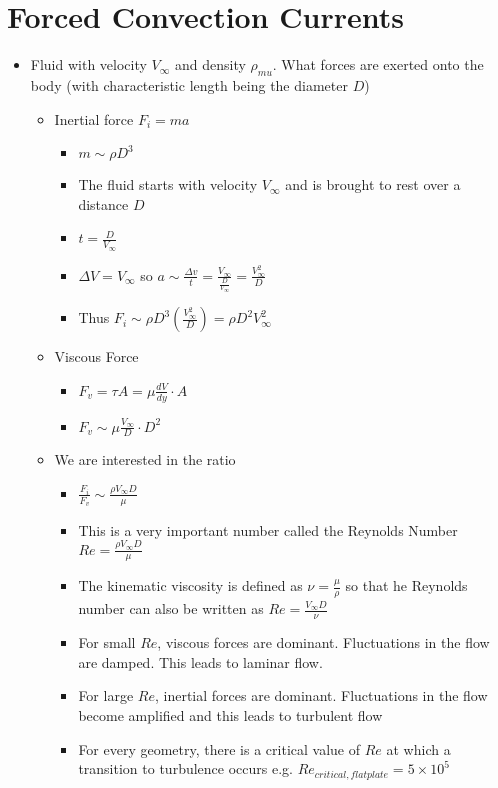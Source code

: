 \documentclass[12pt]{article}
\begin{document}
\section{Forced Convection Currents} \begin{itemize}
    \item Fluid with velocity $V_{\infty}$ and density $\rho_{mu}$. What forces are exerted onto the body (with characteristic length being the diameter $D$) \begin{itemize}
        \item Inertial force $F_i = ma$ \begin{itemize}
            \item $m \sim \rho D^3$
            \item The fluid starts with velocity $V_{\infty}$ and is brought to rest over a distance $D$ 
            \item $t = \frac{D}{V_{\infty}}$
            \item $\Delta V = V_{\infty}$ so $a \sim \frac{\Delta v}{t} = \frac{V_{\infty}}{\frac{D}{V_{\infty}}} = \frac{V_{\infty}^2}{D}$
            \item Thus $F_i \sim \rho D^3 (\frac{V_{\infty}^2}{D}) = \rho D^2 V_{\infty}^2$
        \end{itemize}
        \item Viscous Force \begin{itemize}
            \item $F_v = \tau A = \mu \frac{dV}{dy} \cdot A$
            \item $F_v \sim \mu \frac{V_{\infty}}{D} \cdot D^2$
        \end{itemize}
        \item We are interested in the ratio \begin{itemize} 
            \item $\frac{F_i}{F_v} \sim \frac{\rho V_{\infty} D}{\mu}$
            \item This is a very important number called the Reynolds Number $Re = \frac{\rho V_{\infty} D}{\mu}$
            \item The kinematic viscosity is defined as $\nu = \frac{\mu}{\rho}$ so that he Reynolds number can also be written as $Re = \frac{V_{\infty} D}{\nu }$
            \item For small $Re$, viscous forces are dominant. Fluctuations in the flow are damped. This leads to laminar flow. 
            \item For large $Re$, inertial forces are dominant. Fluctuations in the flow become amplified and this leads to turbulent flow 
            \item For every geometry, there is a critical value of $Re$ at which a transition to turbulence occurs e.g. $Re _{critical, flat plate} = 5 \times 10^5$
        \end{itemize}


\end{itemize}
\end{itemize}
\end{document}
